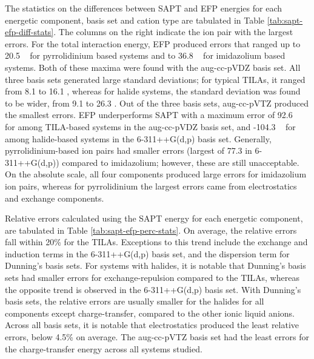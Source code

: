 The statistics on the differences between SAPT and EFP energies for each energetic component, basis set and cation type are tabulated in Table \ref{tab:sapt-efp-diff-stats}.
The columns on the right indicate the ion pair with the largest errors.
For the total interaction energy, EFP produced errors that ranged up to 20.5 \enUnit~ for pyrrolidinium based systems and to 36.8 \enUnit~ for imidazolium based systems. 
Both of these maxima were found with the aug-cc-pVDZ basis set. 
All three basis sets generated large standard deviations; for typical TILAs, it ranged from 8.1 to 16.1 \enUnit, whereas for halide systems, the standard deviation was found to be wider, from 9.1 to 26.3 \enUnit.
Out of the three basis sets,  aug-cc-pVTZ produced the smallest errors. 
EFP underperforms SAPT with a maximum error of 92.6 \enUnit~ for  among TILA-based systems in the aug-cc-pVDZ basis set, and -104.3 \enUnit~ for  among halide-based systems in the 6-311++G(d,p) basis set.
Generally, pyrrolidinium-based ion pairs had smaller errors (largest of 77.3 \enUnit in 6-311++G(d,p)) compared to imidazolium; however, these are still unacceptable.
On the absolute scale, all four components produced large errors for imidazolium ion pairs, whereas for pyrrolidinium the largest errors came from electrostatics and exchange components.




Relative errors calculated using the SAPT energy for each energetic component, are tabulated in Table \ref{tab:sapt-efp-perc-stats}.
On average, the relative errors fall within 20\% for the TILAs. 
Exceptions to this trend include the exchange and induction terms in the 6-311++G(d,p) basis set, and the dispersion term for Dunning's basis sets.
For systems with halides, it is notable that Dunning's basis sets had smaller errors for exchange-repulsion compared to the TILAs, whereas the opposite trend is observed in the 6-311++G(d,p) basis set.
With Dunning's basis sets, the relative errors are usually smaller for the halides for all components except charge-transfer, compared to the other ionic liquid anions.
Across all basis sets, it is notable that electrostatics produced the least relative errors, below 4.5\% on average.
The aug-cc-pVTZ basis set had the least errors for the charge-transfer energy across all systems studied.


